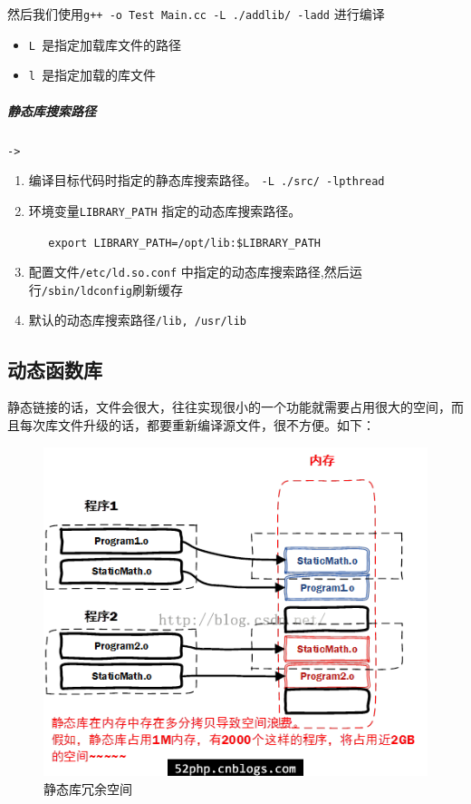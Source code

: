 \documentclass[UTF8,a4paper,12pt]{ctexbook}
\begin{document}
				然后我们使用\verb|g++ -o Test Main.cc -L ./addlib/ -ladd| 进行编译
				
				\begin{itemize}[itemindent = 2em]
					\item \verb|L |是指定加载库文件的路径
					\item \verb|l |是指定加载的库文件
				\end{itemize}
				
			\subparagraph{静态库搜索路径}\verb|->|
			
				\begin{enumerate}[itemindent= 2em]
					\item 编译目标代码时指定的静态库搜索路径。 \verb|-L ./src/ -lpthread|
					\item 环境变量\verb|LIBRARY_PATH| 指定的动态库搜索路径。
					
					 \verb|   export LIBRARY_PATH=/opt/lib:$LIBRARY_PATH|
					\item 配置文件\verb|/etc/ld.so.conf| 中指定的动态库搜索路径,然后运行\verb|/sbin/ldconfig|刷新缓存
					\item 默认的动态库搜索路径\verb|/lib, /usr/lib|
				\end{enumerate}
				
		\subsection{动态函数库}
			静态链接的话，文件会很大，往往实现很小的一个功能就需要占用很大的空间，而且每次库文件升级的话，都要重新编译源文件，很不方便。如下：
			\begin{figure}[h]
				\centering
				\includegraphics[scale = 0.7]{staticLib-disAdvantage.png}
				\caption{静态库冗余空间}
			\end{figure}
			
\end{document}
